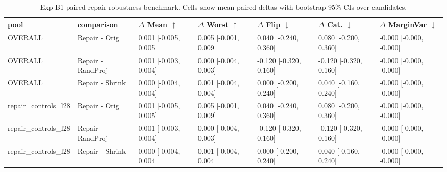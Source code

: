 \begin{table}[t]
\centering
\begin{tabular}{lllllll}
\toprule
pool & comparison & $\Delta$ Mean $\uparrow$ & $\Delta$ Worst $\uparrow$ & $\Delta$ Flip $\downarrow$ & $\Delta$ Cat. $\downarrow$ & $\Delta$ MarginVar $\downarrow$ \\
\midrule
OVERALL & Repair - Orig & 0.001 [-0.005, 0.005] & 0.005 [-0.001, 0.009] & 0.040 [-0.240, 0.360] & 0.080 [-0.200, 0.360] & -0.000 [-0.000, -0.000] \\
OVERALL & Repair - RandProj & 0.001 [-0.003, 0.004] & 0.000 [-0.004, 0.003] & -0.120 [-0.320, 0.160] & -0.120 [-0.320, 0.160] & -0.000 [-0.000, -0.000] \\
OVERALL & Repair - Shrink & 0.000 [-0.004, 0.004] & 0.001 [-0.004, 0.004] & 0.000 [-0.200, 0.240] & 0.040 [-0.160, 0.240] & -0.000 [-0.000, -0.000] \\
repair_controls_l28 & Repair - Orig & 0.001 [-0.005, 0.005] & 0.005 [-0.001, 0.009] & 0.040 [-0.240, 0.360] & 0.080 [-0.200, 0.360] & -0.000 [-0.000, -0.000] \\
repair_controls_l28 & Repair - RandProj & 0.001 [-0.003, 0.004] & 0.000 [-0.004, 0.003] & -0.120 [-0.320, 0.160] & -0.120 [-0.320, 0.160] & -0.000 [-0.000, -0.000] \\
repair_controls_l28 & Repair - Shrink & 0.000 [-0.004, 0.004] & 0.001 [-0.004, 0.004] & 0.000 [-0.200, 0.240] & 0.040 [-0.160, 0.240] & -0.000 [-0.000, -0.000] \\
\bottomrule
\end{tabular}

\caption{Exp-B1 paired repair robustness benchmark. Cells show mean paired deltas with bootstrap 95\% CIs over candidates.}
\label{tab:b1_repair}
\end{table}